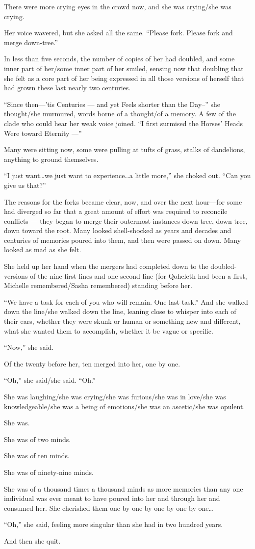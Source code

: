 There were more crying eyes in the crowd now, and she was crying/she was crying.

Her voice wavered, but she asked all the same. ``Please fork. Please fork and merge down-tree.''

In less than five seconds, the number of copies of her had doubled, and some inner part of her/some inner part of her smiled, sensing now that doubling that she felt as a core part of her being expressed in all those versions of herself that had grown these last nearly two centuries.

``Since then---'tis Centuries — and yet Feels shorter than the Day--'' she thought/she murmured, words borne of a thought/of a memory. A few of the clade who could hear her weak voice joined. ``I first surmised the Horses' Heads Were toward Eternity —''

Many were sitting now, some were pulling at tufts of grass, stalks of dandelions, anything to ground themselves.

``I just want\ldots we just want to experience\ldots a little more,'' she choked out. ``Can you give us that?''

The reasons for the forks became clear, now, and over the next hour---for some had diverged so far that a great amount of effort was required to reconcile conflicts — they began to merge their outermost instances down-tree, down-tree, down toward the root. Many looked shell-shocked as years and decades and centuries of memories poured into them, and then were passed on down. Many looked as mad as she felt.

She held up her hand when the mergers had completed down to the doubled-versions of the nine first lines and one second line (for Qoheleth had been a first, Michelle remembered/Sasha remembered) standing before her.

``We have a task for each of you who will remain. One last task.'' And she walked down the line/she walked down the line, leaning close to whisper into each of their ears, whether they were skunk or human or something new and different, what she wanted them to accomplish, whether it be vague or specific.

``Now,'' she said.

Of the twenty before her, ten merged into her, one by one.

``Oh,'' she said/she said. ``Oh.''

She was laughing/she was crying/she was furious/she was in love/she was knowledgeable/she was a being of emotions/she was an ascetic/she was opulent.

She was.

She was of two minds.

She was of ten minds.

She was of ninety-nine minds.

She was of a thousand times a thousand minds as more memories than any one individual was ever meant to have poured into her and through her and consumed her. She cherished them one by one by one by one by one\ldots{}

``Oh,'' she said, feeling more singular than she had in two hundred years.

And then she quit.
